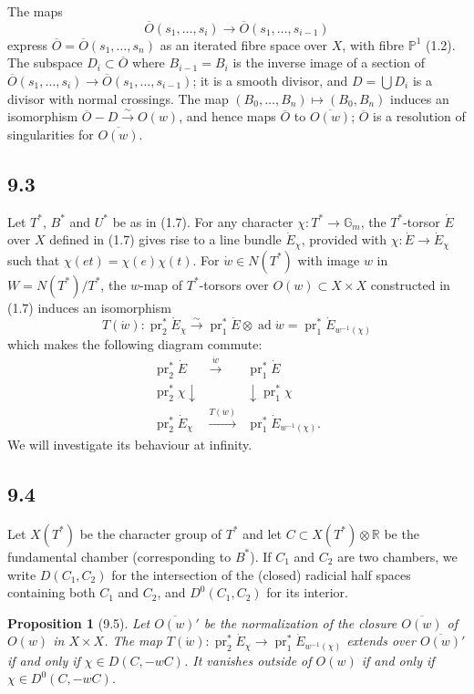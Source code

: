 \documentclass[11pt]{amsart}
\theoremstyle{plain}
\newtheorem{proposition}[theorem]{Proposition}
\theoremstyle{remark}
\DeclareMathOperator{\pr}{pr}
\DeclareMathOperator{\ad}{ad}
\begin{document}
The maps
\[
\overline{O}(s_1, \dots, s_i) \longrightarrow \overline{O}(s_1, \dots, s_{i-1})
\]
express $\overline{O} = \overline{O}(s_1, \dots, s_n)$ as an iterated fibre space over $X$, with fibre $\mathbb{P}^1$ (1.2). The subspace $D_i \subset \overline{O}$ where $B_{i-1} = B_i$ is the inverse image of a section of $\overline{O}(s_1, \dots, s_i) \to \overline{O}(s_1, \dots, s_{i-1})$; it is a smooth divisor, and $D = \bigcup D_i$ is a divisor with normal crossings. The map $(B_0, \dots, B_n) \mapsto (B_0, B_n)$ induces an isomorphism $\overline{O} - D \xrightarrow{\sim} O(w)$, and hence maps $\overline{O}$ to $\overline{O(w)}$; $\overline{O}$ is a resolution of singularities for $\overline{O(w)}$.

\subsection{9.3} Let $T^*$, $B^*$ and $U^*$ be as in (1.7). For any character $\chi: T^* \to \mathbb{G}_m$, the $T^*$-torsor $\dot{E}$ over $X$ defined in (1.7) gives rise to a line bundle $\dot{E}_\chi$, provided with $\chi: \dot{E} \to \dot{E}_\chi$ such that $\chi(et) = \chi(e)\chi(t)$. For $\dot{w} \in N(T^*)$ with image $w$ in $W = N(T^*)/T^*$, the $w$-map of $T^*$-torsors over $O(w) \subset X \times X$ constructed in (1.7) induces an isomorphism
\[
T(\dot{w}): \pr_2^* \dot{E}_\chi \xrightarrow{\sim} \pr_1^* \dot{E} \otimes \ad\dot{w} = \pr_1^* \dot{E}_{w^{-1}(\chi)}
\]
which makes the following diagram commute:
\[
\begin{array}{ccc}
\pr_2^* \dot{E} & \xrightarrow{\dot{w}} & \pr_1^* \dot{E} \\
\pr_2^* \chi \downarrow & & \downarrow \pr_1^* \chi \\
\pr_2^* \dot{E}_\chi & \xrightarrow{T(\dot{w})} & \pr_1^* \dot{E}_{w^{-1}(\chi)}.
\end{array}
\]
We will investigate its behaviour at infinity.

\subsection{9.4} Let $X(T^*)$ be the character group of $T^*$ and let $C \subset X(T^*) \otimes \mathbb{R}$ be the fundamental chamber (corresponding to $B^*$). If $C_1$ and $C_2$ are two chambers, we write $D(C_1, C_2)$ for the intersection of the (closed) radicial half spaces containing both $C_1$ and $C_2$, and $D^0(C_1, C_2)$ for its interior.

\begin{proposition}[9.5]
Let $\overline{O(w)}'$ be the normalization of the closure $\overline{O(w)}$ of $O(w)$ in $X \times X$. The map $T(\dot{w}): \pr_2^* \dot{E}_\chi \to \pr_1^* \dot{E}_{w^{-1}(\chi)}$ extends over $\overline{O(w)}'$ if and only if $\chi \in D(C, -wC)$. It vanishes outside of $O(w)$ if and only if $\chi \in D^0(C, -wC)$.
\end{proposition}
\end{document}
